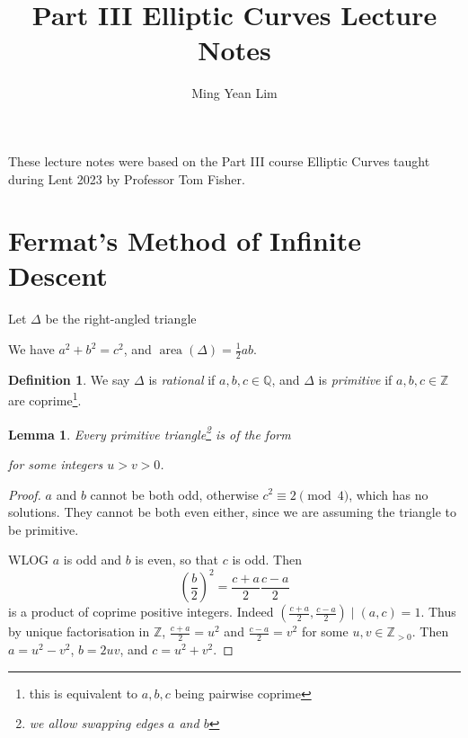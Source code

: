 \documentclass[11pt]{article}
\title{Part III Elliptic Curves Lecture Notes}
\author{Ming Yean Lim}
\theoremstyle{definition}
\newtheorem*{definition*}{Definition}
\theoremstyle{plain}
\newtheorem{lemma}[definition]{Lemma}
\theoremstyle{remark}
\DeclareMathOperator{\area}{area}
\newcommand{\ZZ}{\mathbb{Z}}
\newcommand{\QQ}{\mathbb{Q}}
\begin{document}
\maketitle

\noindent These lecture notes were based on the Part III course Elliptic Curves taught during Lent 2023 by Professor Tom Fisher.



\section{Fermat's Method of Infinite Descent}

Let $\Delta$ be the right-angled triangle
\begin{center}
\end{center}
We have $a^2 + b^2 = c^2$, and $\area(\Delta) = \frac{1}{2} a b$.

\begin{definition*}
    We say $\Delta$ is \emph{rational} if $a, b, c \in \QQ$, and $\Delta$ is \emph{primitive} if $a, b, c \in \ZZ$ are coprime\footnote{this is equivalent to $a, b, c$ being pairwise coprime}.
\end{definition*}

\begin{lemma}\label{lem:1_1}
    Every primitive triangle\footnote{we allow swapping edges $a$ and $b$} is of the form
    \begin{center}
    \end{center}
    for some integers $u > v > 0$.
\end{lemma}
\begin{proof}
    $a$ and $b$ cannot be both odd, otherwise $c^2 \equiv 2 \pmod{4}$, which has no solutions. They cannot be both even either, since we are assuming the triangle to be primitive.

    WLOG $a$ is odd and $b$ is even, so that $c$ is odd. Then
    \begin{equation*}
        \left(\frac{b}{2}\right)^2 = \frac{c+a}{2} \frac{c-a}{2}
    \end{equation*}
    is a product of coprime positive integers. Indeed $(\frac{c+a}{2}, \frac{c-a}{2}) \mid (a, c) = 1$. Thus by unique factorisation in $\ZZ$, $\frac{c+a}{2} = u^2$ and $\frac{c-a}{2} = v^2$ for some $u, v \in \ZZ_{>0}$. Then $a = u^2 - v^2$, $b = 2uv$, and $c = u^2 + v^2$.
\end{proof}
\end{document}
